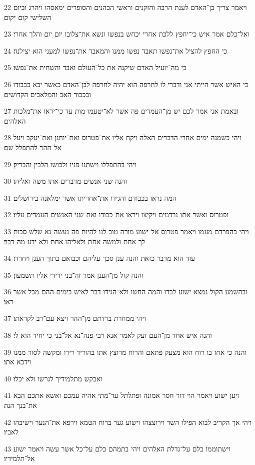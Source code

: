 \par 22 ויאמר צריך בן־האדם לענת הרבה והזקנים וראשי הכהנים והסופרים ימאסהו ויהרג וביום השלישי קום יקום׃
\par 23 ואל־כלם אמר איש כי־יחפץ ללכת אחרי יכחש בנפשו ונשא את־צלובו יום יום והלך אחרי׃
\par 24 כי החפץ להציל את־נפשו תאבד נפשו ממנו והמאבד את־נפשו למעני הוא יצילנה׃
\par 25 כי מה־יועיל האדם שיקנה את כל־העולם ואבד והשחית את־נפשו׃
\par 26 כי האיש אשר הייתי אני ודברי לו לחרפה הוא יהיה לחרפה לבן־האדם כאשר יבא בכבודו ובכבוד האב והמלאכים הקדושים׃
\par 27 ובאמת אני אמר לכם יש מן־העמדים פה אשר לא־יטעמו מות עד כי־יראו את־מלכות האלהים׃
\par 28 ויהי כשמנה ימים אחרי הדברים האלה ויקח אליו את־פטרוס ואת־יוחנן ואת־יעקב ויעל אל־ההר להתפלל שם׃
\par 29 ויהי בהתפללו וישתנו פניו ולבושו הלבין והבריק׃
\par 30 והנה שני אנשים מדברים אתו משה ואליהו׃
\par 31 המה נראו בכבודם והגידו את־אחריתו אשר ימלאנה בירושלים׃
\par 32 ופטרוס ואשר אתו נרדמים ויקיצו ויראו את־כבודו ואת־שני האנשים העמדים עליו׃
\par 33 ויהי כהפרדם מעמו ויאמר פטרוס אל־ישוע מורה טוב לנו להיות פה נעשה־נא שלש סכות לך אחת ולמשה אחת ולאליהו אחת ולא ידע מה־דבר׃
\par 34 עוד הוא מדבר כזאת והנה ענן סכך עליהם וכבואם בתוך הענן ויחרדו׃
\par 35 והנה קול מן־הענן אמר זה־בני ידידי אליו תשמעון׃
\par 36 ובהשמע הקול נמצא ישוע לבדו והמה החשו ולא־הגידו דבר לאיש בימים ההם מכל אשר ראו׃
\par 37 ויהי ממחרת ברדתם מן־ההר ויצא עם־רב לקראתו׃
\par 38 והנה איש אחד מן־העם זעק לאמר אנא רבי פנה־נא אל־בני כי יחיד הוא לי׃
\par 39 והנה כי אחז בו רוח הוא מצעק פתאם והרוח מרוצץ אתו בהוריד רירו ומקשה לסור ממנו וידכא אתו׃
\par 40 ואבקש מתלמידיך לגרשו ולא יכלו׃
\par 41 ויען ישוע ויאמר הוי דור חסר אמונה ופתלתל עד־מתי אהיה עמכם ואשא אתכם הבא את־בנך הנה׃
\par 42 ויהי אך הקריב לבוא הפילו השד וירוצצהו וישוע גער ברוח הטמא וירפא את־הנער וישיבהו לאביו׃
\par 43 וישתוממו כלם על־גדלת האלהים ויהי בתמהם כלם על־כל אשר עשה ויאמר ישוע אל־תלמידיו׃
